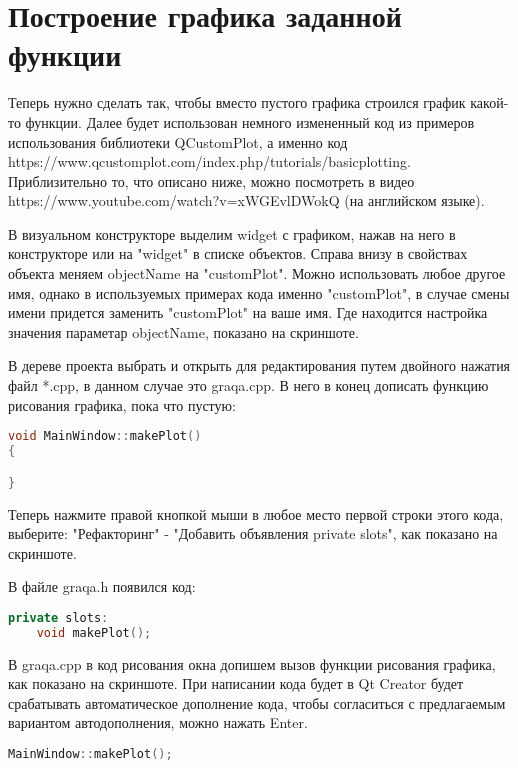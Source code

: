 \section{Построение графика заданной функции}

Теперь нужно сделать так, чтобы вместо пустого графика строился график какой-то функции. Далее будет использован немного измененный код из примеров использования библиотеки QCustomPlot, а именно код https://www.qcustomplot.com/index.php/tutorials/basicplotting. Приблизительно то, что описано ниже, можно посмотреть в видео https://www.youtube.com/watch?v=xWGEvlDWokQ (на английском языке).

В визуальном конструкторе выделим widget с графиком, нажав на него в конструкторе или на "widget" в списке объектов. Справа внизу в свойствах объекта меняем objectName на "customPlot". Можно использовать любое другое имя, однако в используемых примерах кода именно "customPlot", в случае смены имени придется заменить "customPlot" на ваше имя. Где находится настройка значения параметар objectName, показано на скриншоте.

В дереве проекта выбрать и открыть для редактирования путем двойного нажатия файл *.cpp, в данном случае это graqa.cpp. В него в конец дописать функцию рисования графика, пока что пустую:
\begin{lstlisting}[language=c++]
void MainWindow::makePlot()
{

}
\end{lstlisting}

Теперь нажмите правой кнопкой мыши в любое место первой строки этого кода, выберите: "Рефакторинг" - "Добавить объявления private slots", как показано на скриншоте.

В файле graqa.h появился код:
\begin{lstlisting}[language=c++]
private slots:
    void makePlot();
\end{lstlisting}

В graqa.cpp в код рисования окна допишем вызов функции рисования графика, как показано на скриншоте. При написании кода будет в Qt Creator будет срабатывать автоматическое дополнение кода, чтобы согласиться с предлагаемым вариантом автодополнения, можно нажать Enter.
\begin{lstlisting}[language=c++]
MainWindow::makePlot();
\end{lstlisting}


